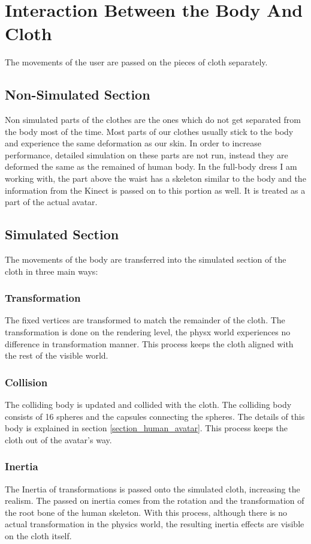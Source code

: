 \section{Interaction Between the Body And Cloth}
\label{section_body_cloth_interaction}
The movements of the user are passed on the pieces of cloth separately.

\subsection{Non-Simulated Section}
Non simulated parts of the clothes are the ones which do not get separated from
the body most of the time. Most parts of our clothes usually stick to the body and experience the same deformation as our skin. In order to increase performance, detailed simulation on these parts are not run, instead they are deformed the same as the remained of human body. In the full-body dress I am working with, the part above the waist has a skeleton similar to the body and the information from the Kinect is passed on to this portion as well. It is treated as a part of the actual avatar.

\subsection{Simulated Section}
The movements of the body are transferred into the simulated section of the cloth in three main ways:

\subsubsection{Transformation}
The fixed vertices are transformed to match the remainder of the cloth. The
transformation is done on the rendering level, the physx world experiences no difference in transformation manner. This process keeps the cloth aligned with the rest of the visible world.

\subsubsection{Collision}
The colliding body is updated and collided with the cloth. The colliding body
consists of 16 spheres and the capsules connecting the spheres. The details of
this body is explained in section \ref{section_human_avatar}. This process keeps the
cloth out of the avatar’s way.

\subsubsection{Inertia}
The Inertia of transformations is passed onto the simulated cloth, increasing
the realism. The passed on inertia comes from the rotation and the transformation of the root bone of the human skeleton. With this process, although there is no actual transformation in the physics world, the resulting inertia effects are visible on the cloth itself. 

